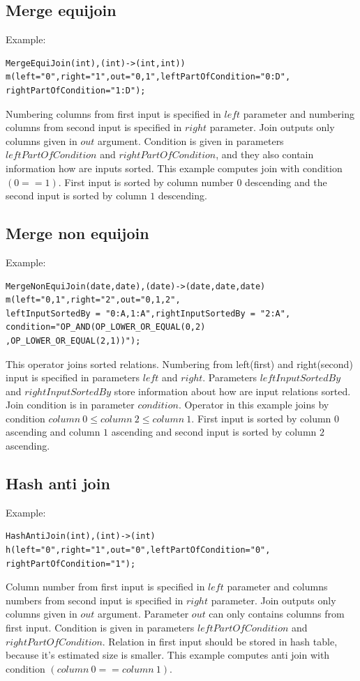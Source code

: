 \subsection{Merge equijoin}
Example:
\begin{lstlisting}
MergeEquiJoin(int),(int)->(int,int))
m(left="0",right="1",out="0,1",leftPartOfCondition="0:D",
rightPartOfCondition="1:D");
\end{lstlisting}
Numbering columns from first input is specified in $left$ parameter and numbering columns from second input is specified in $right$ parameter. Join outputs only columns given in $out$ argument. Condition is given in parameters $leftPartOfCondition$ and $rightPartOfCondition$, and they also contain information how are inputs sorted. This example computes join with condition $(0==1)$. First input is sorted by column number $0$ descending and the second input is sorted by column $1$ descending.

\subsection{Merge non equijoin}
Example:
\begin{lstlisting}
MergeNonEquiJoin(date,date),(date)->(date,date,date)
m(left="0,1",right="2",out="0,1,2",
leftInputSortedBy = "0:A,1:A",rightInputSortedBy = "2:A",
condition="OP_AND(OP_LOWER_OR_EQUAL(0,2)
,OP_LOWER_OR_EQUAL(2,1))");
\end{lstlisting}

This operator joins sorted relations. Numbering from left(first) and right(second) input is specified in parameters $left$ and $right$. Parameters $leftInputSortedBy$ and $rightInputSortedBy$ store information about how are input relations sorted. Join condition is in parameter $condition$. Operator in this example joins by condition $column~0 \leq column~2\leq column~1$. First input is sorted by column $0$ ascending and column $1$ ascending and second input is sorted by column $2$ ascending.

\subsection{Hash anti join}
Example:
\begin{lstlisting}
HashAntiJoin(int),(int)->(int)
h(left="0",right="1",out="0",leftPartOfCondition="0",
rightPartOfCondition="1"); 
\end{lstlisting}

Column number from first input is specified in $left$ parameter and columns numbers from second input is specified in $right$ parameter. Join outputs only columns given in $out$ argument. Parameter $out$ can only contains columns from first input. Condition is given in parameters $leftPartOfCondition$ and $rightPartOfCondition$.
Relation in first input should be stored in hash table, because it's estimated size is smaller. This example computes anti join with condition $(column~0==column~1)$.

